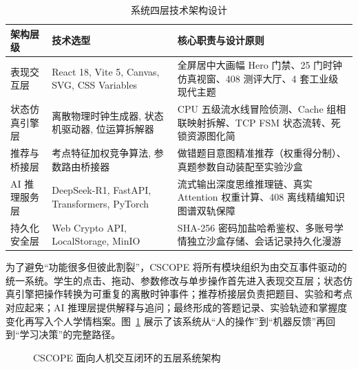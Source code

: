 \documentclass[UTF8,a4paper,11pt]{ctexart}
\begin{document}
\begin{table}[htbp]
\centering
\small
\caption{系统四层技术架构设计}
\begin{tabularx}{\textwidth}{p{2.8cm}p{3.5cm}X}
\toprule
\textbf{架构层级} & \textbf{技术选型} & \textbf{核心职责与设计原则} \\
\midrule
表现交互层 & React 18, Vite 5, Canvas, SVG, CSS Variables & 全屏居中大画幅 Hero 门禁、25 门时钟仿真视窗、408 测评大厅、4 套工业级现代主题 \\
状态仿真引擎层 & 离散物理时钟生成器, 状态机驱动器, 位运算拆解器 & CPU 五级流水线冒险侦测、Cache 组相联映射拆解、TCP FSM 状态流转、死锁资源图化简 \\
推荐与桥接层 & 考点特征加权竞争算法, 参数路由桥接器 & 做错题目意图精准推荐（权重得分制）、真题参数自动装配至实验沙盒 \\
AI 推理服务层 & DeepSeek-R1, FastAPI, Transformers, PyTorch & 流式输出深度思维推理链、真实 Attention 权重计算、408 离线精编知识图谱双轨保障 \\
持久化安全层 & Web Crypto API, LocalStorage, MinIO & SHA-256 密码加盐哈希鉴权、多账号学情独立沙盒存储、会话记录持久化漫游 \\
\bottomrule
\end{tabularx}
\end{table}

为了避免“功能很多但彼此割裂”，CSCOPE 将所有模块组织为由交互事件驱动的统一系统。学生的点击、拖动、参数修改与单步操作首先进入表现交互层；状态仿真引擎把操作转换为可重复的离散时钟事件；推荐桥接层负责把题目、实验和考点对应起来；AI 推理层提供解释与追问；最终形成的答题记录、实验轨迹和掌握度变化再写入个人学情档案。图~\ref{fig:architecture} 展示了该系统从“人的操作”到“机器反馈”再回到“学习决策”的完整路径。

\begin{figure}[htbp]
\centering
{}
\caption{CSCOPE 面向人机交互闭环的五层系统架构}
\label{fig:architecture}
\end{figure}
\end{document}

